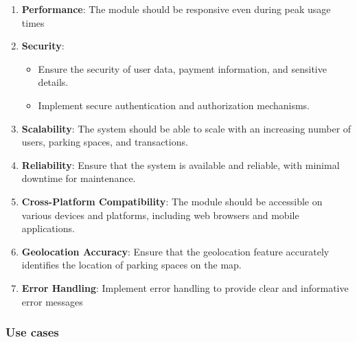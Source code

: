 \begin{enumerate}
    \item \textbf{Performance}: The module should be responsive even during peak usage times
    \item \textbf{Security}:
        \begin{itemize}
            \item Ensure the security of user data, payment information, and sensitive details.
            \item Implement secure authentication and authorization mechanisms.
        \end{itemize}
    \item \textbf{Scalability}: The system should be able to scale with an increasing number of users, parking spaces, and transactions.
    \item \textbf{Reliability}: Ensure that the system is available and reliable, with minimal downtime for maintenance.
    \item \textbf{Cross-Platform Compatibility}: The module should be accessible on various devices and platforms, including web browsers and mobile applications.
    \item \textbf{Geolocation Accuracy}: Ensure that the geolocation feature accurately identifies the
    location of parking spaces on the map.
    \item \textbf{Error Handling}: Implement error handling to provide clear and informative error messages
\end{enumerate}

\subsubsection{Use cases}


